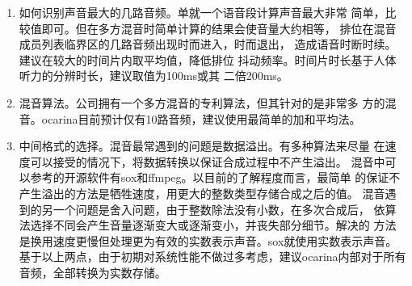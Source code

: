 \documentclass[11pt]{article}
\begin{document}
\begin{enumerate}
        \item 如何识别声音最大的几路音频。单就一个语音段计算声音最大非常
            简单，比较值即可。但在多方混音时简单计算的结果会使音量大约相等，
            排位在混音成员列表临界区的几路音频出现时而进入，时而退出，
            造成语音时断时续。建议在较大的时间片内取平均值，降低排位
            抖动频率。时间片时长基于人体听力的分辨时长，建议取值为100ms或其
            二倍200ms。

        \item 混音算法。公司拥有一个多方混音的专利算法，但其针对的是非常多
            方的混音。ocarina目前预计仅有10路音频，建议使用最简单的加和平均法。

        \item 中间格式的选择。混音最常遇到的问题是数据溢出。有多种算法来尽量
            在速度可以接受的情况下，将数据转换以保证合成过程中不产生溢出。
            混音中可以参考的开源软件有sox和ffmpeg。以目前的了解程度而言，最简单
            的保证不产生溢出的方法是牺牲速度，用更大的整数类型存储合成之后的值。
            混音遇到的另一个问题是舍入问题，由于整数除法没有小数，在多次合成后，
            依算法选择不同会产生音量逐渐变大或逐渐变小，并丧失部分细节。解决的
            方法是换用速度更慢但处理更为有效的实数表示声音。sox就使用实数表示声音。
            基于以上两点，由于初期对系统性能不做过多考虑，建议ocarina内部对于所有
            音频，全部转换为实数存储。

    \end{enumerate}
\end{document}
